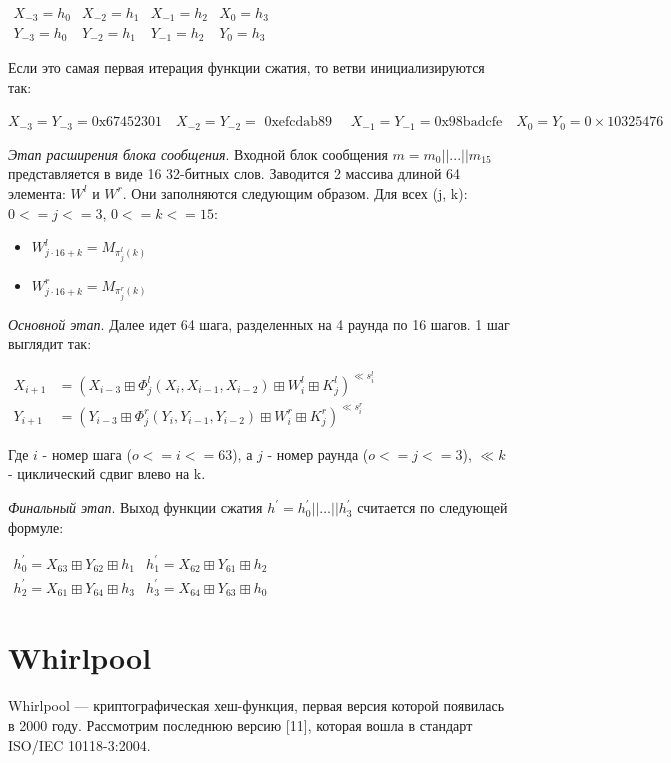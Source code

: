 \documentclass[colorthm]{./civarticle}
\begin{document}
$\begin{array}{llll}
X_{-3}=h_0 & X_{-2}=h_1 & X_{-1}=h_2 & X_0=h_3 \\
Y_{-3}=h_0 & Y_{-2}=h_1 & Y_{-1}=h_2 & Y_0=h_3
\end{array}$

Если это самая первая итерация функции сжатия, то ветви инициализируются так:

$X_{-3}=Y_{-3}=0 \mathrm{x} 67452301 \quad X_{-2}=Y_{-2}=\text { 0xefcdab89 } \quad X_{-1}=Y_{-1}=0 \mathrm{x} 98 \mathrm{badcfe} \quad X_0=Y_0=0 \times 10325476$

\textit{Этап расширения блока сообщения}. Входной блок сообщения $m=m_0||...||m_15$ представляется в виде 16 32-битных слов. Заводится 2 массива длиной 64 элемента: $W^l$ и $W^r$. Они заполняются следующим образом. Для всех (j, k): $0<=j<=3$, $0<=k<=15$:

\begin{itemize}
    \item $W_{j \cdot 16+k}^l=M_{\pi_j^l(k)}$
    \item $W_{j \cdot 16+k}^r=M_{\pi_j^r(k)}$
\end{itemize}

\textit{Основной этап}. Далее идет 64 шага, разделенных на 4 раунда по 16 шагов. 1 шаг выглядит так:

$\begin{aligned}
X_{i+1} & =\left(X_{i-3} \boxplus \Phi_j^l\left(X_i, X_{i-1}, X_{i-2}\right) \boxplus W_i^l \boxplus K_j^l\right)^{\ll  s_i^l} \\
Y_{i+1} & =\left(Y_{i-3} \boxplus \Phi_j^r\left(Y_i, Y_{i-1}, Y_{i-2}\right) \boxplus W_i^r \boxplus K_j^r\right)^{\ll s_i^r}
\end{aligned}$

Где $i$ - номер шага ($o<=i<=63$), а $j$ - номер раунда ($o<=j<=3$), $\ll k$ - циклический сдвиг влево на k.

\textit{Финальный этап}. Выход функции сжатия $h^{'}=h^{'}_{0}||\ldots||h^{'}_{3}$ считается по следующей формуле:

$\begin{array}{ll}
h_0^{\prime}=X_{63} \boxplus Y_{62} \boxplus h_1 & h_1^{\prime}=X_{62} \boxplus Y_{61} \boxplus h_2 \\
h_2^{\prime}=X_{61} \boxplus Y_{64} \boxplus h_3 & h_3^{\prime}=X_{64} \boxplus Y_{63} \boxplus h_0
\end{array}$

\section{Whirlpool}
Whirlpool — криптографическая хеш-функция, первая версия которой появилась в 2000 году. Рассмотрим последнюю версию [11], которая вошла в стандарт ISO/IEC 10118-3:2004.
\end{document}
